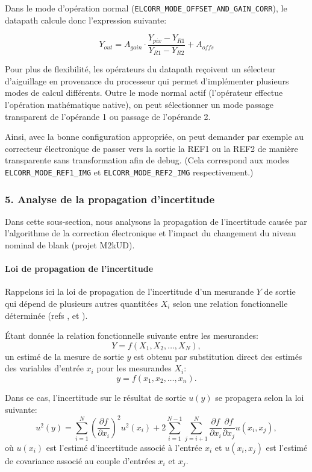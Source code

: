 \documentclass[11pt]{report}
\newcommand{\pd}[2]{\frac{\partial{#1}}{\partial{#2}}}
\begin{document}
Dans le mode d'opération normal (\texttt{ELCORR\_MODE\_OFFSET\_AND\_GAIN\_CORR}), le datapath calcule donc l'expression suivante:

\[ Y_{out}=A_{gain}\cdot\frac{Y_{pix}-Y_{R1}}{Y_{R1}-Y_{R2}}+A_{offs} \]

Pour plus de flexibilité, les opérateurs du datapath reçoivent un sélecteur d'aiguillage en provenance du processeur qui permet d'implémenter plusieurs modes de calcul différents. Outre le mode normal actif (l'opérateur effectue l'opération mathématique native), on peut sélectionner un mode passage transparent de l'opérande 1 ou passage de l'opérande 2. 

Ainsi, avec la bonne configuration appropriée, on peut demander par exemple au correcteur électronique de passer vers la sortie la REF1 ou la REF2 de manière transparente sans transformation afin de debug. (Cela correspond aux modes \texttt{ELCORR\_MODE\_REF1\_IMG} et \texttt{ELCORR\_MODE\_REF2\_IMG} respectivement.)

\subsubsection{5. Analyse de la propagation d'incertitude}
Dans cette sous-section, nous analysons la propagation de l'incertitude causée par l'algorithme de la correction électronique et l'impact du changement du niveau nominal de blank (projet M2kUD).

\paragraph{Loi de propagation de l'incertitude}
Rappelons ici la loi de propagation de l'incertitude d'un mesurande $Y$ de sortie qui dépend de plusieurs autres quantitées $X_i$ selon une relation fonctionnelle déterminée (refs \cite{nist94}, \cite{ea402} et \cite{taylor97}).

Étant donnée la relation fonctionnelle suivante entre les mesurandes:
\[Y = f(X_1,X_2,\ldots,X_N),\]
un estimé de la mesure de sortie $y$ est obtenu par substitution direct des estimés des variables d'entrée $x_i$ pour les mesurandes $X_i$:
\[y=f(x_1,x_2,\ldots,x_n).\]

Dans ce cas, l'incertitude sur le résultat de sortie $u(y)$ se propagera selon la loi suivante:
\[u^2(y)=\sum_{i=1}^N \left(\pd{f}{x_i}\right)^2 u^2(x_i)
 +2\sum_{i=1}^{N-1}\sum_{j=i+1}^{N}\pd{f}{x_i}\pd{f}{x_j}u(x_i,x_j),\]
 où $u(x_i)$ est l'estimé d'incertitude associé à l'entrée $x_i$ et $u(x_i,x_j)$ est l'estimé de covariance associé au couple d'entrées $x_i$ et $x_j$.
 
\end{document}
